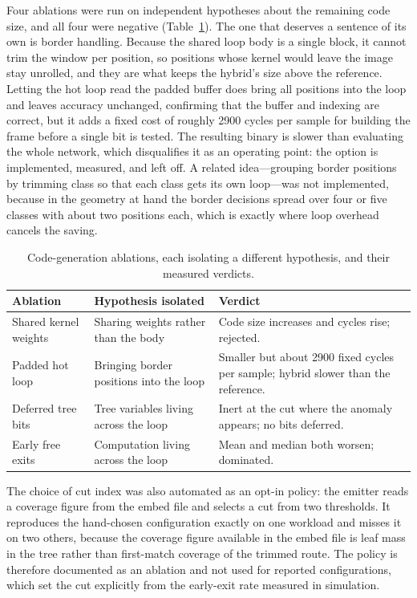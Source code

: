 Four ablations were run on independent hypotheses about the remaining code size, and all four were negative (Table~\ref{tab:impl-ablations}).
The one that deserves a sentence of its own is border handling.
Because the shared loop body is a single block, it cannot trim the window per position, so positions whose kernel would leave the image stay unrolled, and they are what keeps the hybrid's size above the reference.
Letting the hot loop read the padded buffer does bring all positions into the loop and leaves accuracy unchanged, confirming that the buffer and indexing are correct, but it adds a fixed cost of roughly 2900 cycles per sample for building the frame before a single bit is tested.
The resulting binary is slower than evaluating the whole network, which disqualifies it as an operating point: the option is implemented, measured, and left off.
A related idea---grouping border positions by trimming class so that each class gets its own loop---was not implemented, because in the geometry at hand the border decisions spread over four or five classes with about two positions each, which is exactly where loop overhead cancels the saving.

\begin{table}[H]
	\centering
	\small
	\caption{Code-generation ablations, each isolating a different hypothesis, and their measured verdicts.}
	\label{tab:impl-ablations}
	\begin{tabularx}{\textwidth}{@{}>{\raggedright\arraybackslash}p{}>{\raggedright\arraybackslash}p{}X@{}}
		\toprule
		\textbf{Ablation} & \textbf{Hypothesis isolated} & \textbf{Verdict} \\
		\midrule
		Shared kernel weights & Sharing weights rather than the body & Code size increases and cycles rise; rejected. \\
		Padded hot loop & Bringing border positions into the loop & Smaller but about 2900 fixed cycles per sample; hybrid slower than the reference. \\
		Deferred tree bits & Tree variables living across the loop & Inert at the cut where the anomaly appears; no bits deferred. \\
		Early free exits & Computation living across the loop & Mean and median both worsen; dominated. \\
		\bottomrule
	\end{tabularx}
\end{table}

The choice of cut index was also automated as an opt-in policy: the emitter reads a coverage figure from the embed file and selects a cut from two thresholds.
It reproduces the hand-chosen configuration exactly on one workload and misses it on two others, because the coverage figure available in the embed file is leaf mass in the tree rather than first-match coverage of the trimmed route.
The policy is therefore documented as an ablation and not used for reported configurations, which set the cut explicitly from the early-exit rate measured in simulation.

